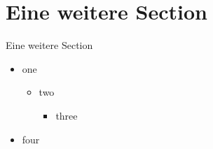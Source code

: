 \documentclass{beamer}
\begin{document}
\section{Eine weitere Section}\label{sec:another_section}
\begin{frame}{Eine weitere Section}
    \begin{itemize}
    \item one
    \begin{itemize}
        \item two
        \begin{itemize}
            \item three
        \end{itemize}    
    \end{itemize}    
    \item four
    \end{itemize}
\end{frame}
\end{document}
